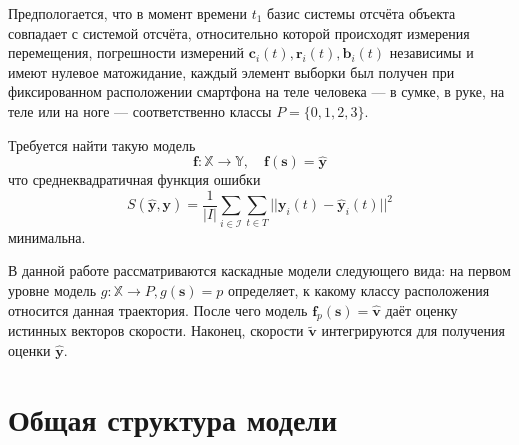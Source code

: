 \documentclass[12pt,twoside]{article}
\begin{document}
Предпологается, что 
в момент времени $t_1$ базис системы отсчёта объекта совпадает с системой отсчёта, относительно которой происходят измерения перемещения, 
погрешности измерений $\mathbf{c}_i(t), \mathbf{r}_i(t), \mathbf{b}_i(t)$ независимы и имеют нулевое матожидание, 
 каждый элемент выборки был получен при фиксированном расположении смартфона на теле человека --- в сумке, в руке, на теле или на ноге 
    --- соответственно классы $ P = \{0, 1, 2, 3 \} $.


Требуется найти такую модель 
$$ 
\mathbf{f}: \mathbb{X} \rightarrow \mathbb{Y}, \quad \mathbf{f}(\mathbf{s}) = \hat{\mathbf{y}} 
$$
что среднеквадратичная функция ошибки 
$$
    S(\hat{\mathbf{y}}, \mathbf{y}) = \frac{1}{|I|} \sum\limits_{i \in \mathcal{I}}
     \sum\limits_{t \in T} || \mathbf{y}_i(t) - \hat{\mathbf{y}}_i(t) ||^2
$$ 
минимальна.

В данной работе рассматриваются каскадные модели следующего вида:
на первом уровне 
модель $g: \mathbb{X} \rightarrow P, g(\mathbf{s}) = p$ определяет, к какому классу расположения относится данная траектория. После чего
модель $\mathbf{f}_p(\mathbf{s}) = \hat{\mathbf{v}} $ даёт оценку истинных векторов скорости. Наконец, скорости $\tilde{\mathbf{v}}$ интегрируются для получения оценки $\hat{\mathbf{y}}$.



%



\section{Общая структура модели}
\end{document}
